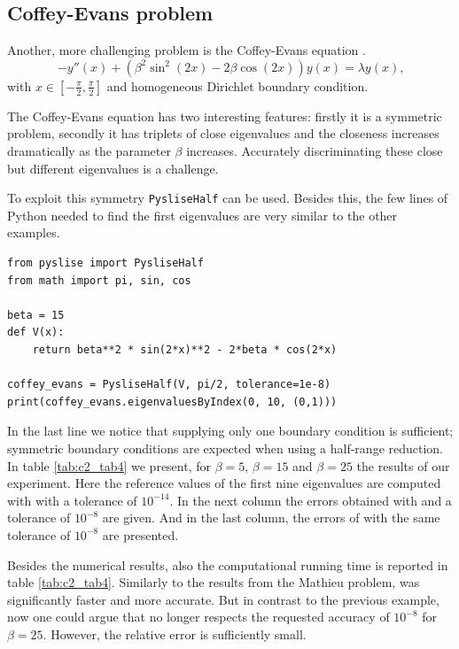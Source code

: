 \subsection{Coffey-Evans problem}\label{sec:c2_numerical_experiments_coffey_evans}

Another, more challenging problem is the Coffey-Evans equation \cite{pryce_error_1986}.
\begin{equation}
  -y''(x) + (\beta^2\sin^2(2x)-2\beta\cos(2x))y(x) = \lambda y(x)\text{,}\label{equ:c2_coffey_evans}
\end{equation}
with $x \in [-\frac{\pi}{2}, \frac{\pi}{2}]$ and homogeneous Dirichlet boundary condition.

The Coffey-Evans equation has two interesting features: firstly it is a symmetric problem, secondly it has triplets of close eigenvalues and the closeness increases dramatically as the parameter $\beta$ increases. Accurately discriminating these close but different eigenvalues is a challenge.

To exploit this symmetry \texttt{PysliseHalf} can be used. Besides this, the few lines of Python needed to find the first eigenvalues are very similar to the other examples.

\begin{verbatim}
from pyslise import PysliseHalf
from math import pi, sin, cos

beta = 15
def V(x):
    return beta**2 * sin(2*x)**2 - 2*beta * cos(2*x)

coffey_evans = PysliseHalf(V, pi/2, tolerance=1e-8)
print(coffey_evans.eigenvaluesByIndex(0, 10, (0,1)))
\end{verbatim}

In the last line we notice that supplying only one boundary condition is sufficient; symmetric boundary conditions are expected when using a half-range reduction. In table \ref{tab:c2_tab4} we present, for $\beta=5$, $\beta=15$ and $\beta=25$ the results of our experiment. Here the reference values of the first nine eigenvalues are computed with  with a tolerance of $10^{-14}$. In the next column the errors obtained with  and a tolerance of $10^{-8}$ are given. And in the last column, the errors of \pyslise{} with the same tolerance of $10^{-8}$ are presented.

Besides the numerical results, also the computational running time is reported in table \ref{tab:c2_tab4}. Similarly to the results from the Mathieu problem, \pyslise{} was significantly faster and more accurate. But in contrast to the previous example, now one could argue that  no longer respects the requested accuracy of $10^{-8}$ for $\beta = 25$. However, the relative error is sufficiently small.

